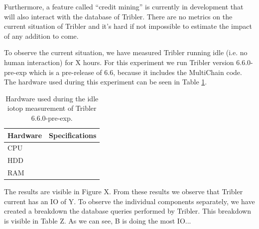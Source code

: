 Furthermore, a feature called ``credit mining'' is currently in development that will also interact with the database of Tribler.
There are no metrics on the current situation of Tribler and it's hard if not impossible to estimate the impact of any addition to come.

To observe the current situation, we have measured Tribler running idle (i.e. no human interaction) for X hours.
For this experiment we run Tribler version 6.6.0-pre-exp which is a pre-release of 6.6, because it includes the MultiChain code.
The hardware used during this experiment can be seen in Table \ref{table:tribler_idle}.

\begin{table}[h]
	\centering
	\begin{tabular}{l|l}
Hardware	& Specifications \\ \hline
CPU			&  \\ 
HDD			&  \\ 
RAM			&  \\
	\end{tabular}
	\caption{Hardware used during the idle iotop measurement of Tribler 6.6.0-pre-exp.}
	\label{table:tribler_idle}
\end{table}

The results are visible in Figure X.
From these results we observe that Tribler current has an IO of Y.
To observe the individual components separately, we have created a breakdown the database queries performed by Tribler.
This breakdown is visible in Table Z.
As we can see, B is doing the most IO... 

